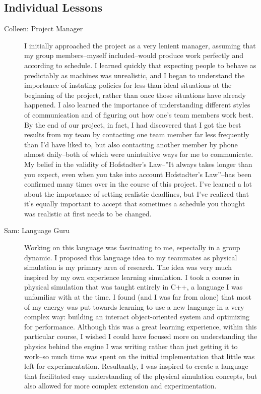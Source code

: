 \subsection{Individual Lessons}
\begin{description}
\item[Colleen: Project Manager] I initially approached the project as
  a very lenient manager, assuming that my group members--myself
  included--would produce work perfectly and according to schedule. I
  learned quickly that expecting people to behave as predictably as
  machines was unrealistic, and I began to understand the importance
  of instating policies for less-than-ideal situations at the
  beginning of the project, rather than once those situations have
  already happened. I also learned the importance of understanding
  different styles of communication and of figuring out how one’s team
  members work best. By the end of our project, in fact, I had
  discovered that I got the best results from my team by contacting
  one team member far less frequently than I’d have liked to, but also
  contacting another member by phone almost daily--both of which were
  unintuitive ways for me to communicate. My belief in the validity of
  Hofstadter’s Law--”It always takes longer than you expect, even when
  you take into account Hofstadter's Law”--has been confirmed many
  times over in the course of this project. I’ve learned a lot about
  the importance of setting realistic deadlines, but I’ve realized
  that it’s equally important to accept that sometimes a schedule you
  thought was realistic at first needs to be changed.

\item[Sam: Language Guru] Working on this language was fascinating to
  me, especially in a group dynamic. I proposed this language idea to
  my teammates as physical simulation is my primary area of
  research. The idea was very much inspired by my own experience
  learning simulation. I took a course in physical simulation that was
  taught entirely in C++, a language I was unfamiliar with at the
  time. I found (and I was far from alone) that most of my energy was
  put towards learning to use a new language in a very complex way:
  building an interact object-oriented system and optimizing for
  performance. Although this was a great learning experience, within
  this particular course, I wished I could have focused more on
  understanding the physics behind the engine I was writing rather
  than just getting it to work--so much time was spent on the initial
  implementation that little was left for
  experimentation. Resultantly, I was inspired to create a language
  that facilitated easy understanding of the physical simulation
  concepts, but also allowed for more complex extension and
  experimentation.


\end{description}

